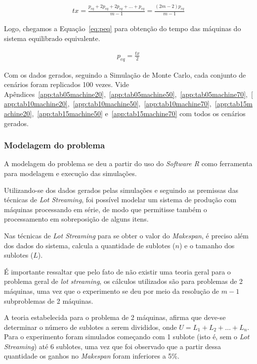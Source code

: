     \begin{eqnarray}
        tx = \frac{p_{eq}+2p_{eq}+2p_{eq}+\ldots+p_{eq}}{m-1}
           = \frac{(2m-2)p_{eq}}{m-1}
        \label{eq:txtempoeq}
    \end{eqnarray}
    
    Logo, chegamos a Equação~\ref{eq:peq} para obtenção do tempo das máquinas do sistema equilibrado equivalente.
    
    \begin{eqnarray}
        p_{eq}=\frac{tx}{2}
        \label{eq:peq}
    \end{eqnarray}
    
    Com os dados gerados, seguindo a Simulação de Monte Carlo, cada conjunto de cenários foram replicados 100 vezes. Vide Apêndices~\ref{app:tab05machine20},~\ref{app:tab05machine50},~\ref{app:tab05machine70},~\ref{app:tab10machine20},~\ref{app:tab10machine50},~\ref{app:tab10machine70},~\ref{app:tab15machine20},~\ref{app:tab15machine50} e~\ref{app:tab15machine70} com todos os cenários gerados.
    
    
    \subsubsection{Modelagem do problema}
    
    A modelagem do problema se deu a partir do uso do \textit{Software R} como ferramenta para modelagem e execução das simulações.
    
    Utilizando-se dos dados gerados pelas simulações e seguindo as premissas das técnicas de \textit{Lot Streaming}, foi possível modelar um sistema de produção com máquinas processando em série, de modo que permitisse também o processamento em sobreposição de alguns itens. 
    
    Nas técnicas de \textit{Lot Streaming} para se obter o valor do \textit{Makespan}, é preciso além dos dados do sistema, calcula a quantidade de sublotes ($n$) e o tamanho dos sublotes ($L$). 
    
    É importante ressaltar que pelo fato de não existir uma teoria geral para o problema geral de \textit{lot streaming}, os cálculos utilizados são para problemas de 2 máquinas, uma vez que o experimento se deu por meio da resolução de $m-1$ subproblemas de 2 máquinas.
    
    A teoria estabelecida para o problema de 2 máquinas, afirma que deve-se determinar o número de sublotes a serem divididos, onde $U = L _ { 1 } + L _ { 2 } + \ldots + L _ { n }$. Para o experimento foram simulados começando com 1 sublote (isto é, sem o \textit{Lot Streaming}) até 6 sublotes, uma vez que foi observado que a partir dessa quantidade os ganhos no \textit{Makespan} foram inferiores a 5\%.
    
